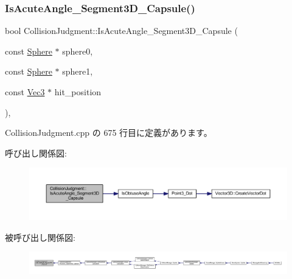 \subsubsection{\texorpdfstring{Is\+Acute\+Angle\+\_\+\+Segment3\+D\+\_\+\+Capsule()}{IsAcuteAngle\_Segment3D\_Capsule()}}
{\footnotesize\ttfamily bool Collision\+Judgment\+::\+Is\+Acute\+Angle\+\_\+\+Segment3\+D\+\_\+\+Capsule (\begin{DoxyParamCaption}\item[{const \mbox{\hyperlink{class_sphere}{Sphere}} $\ast$}]{sphere0,  }\item[{const \mbox{\hyperlink{class_sphere}{Sphere}} $\ast$}]{sphere1,  }\item[{const \mbox{\hyperlink{_vector3_d_8h_ab16f59e4393f29a01ec8b9bbbabbe65d}{Vec3}} $\ast$}]{hit\+\_\+position }\end{DoxyParamCaption})\hspace{0.3cm}{\ttfamily [static]}, {\ttfamily [private]}}



 Collision\+Judgment.\+cpp の 675 行目に定義があります。

呼び出し関係図\+:\nopagebreak
\begin{figure}[H]
\begin{center}
\leavevmode
\includegraphics[width=350pt]{class_collision_judgment_af4da6d6923d8ee57253b1e86436e6ec5_cgraph}
\end{center}
\end{figure}
被呼び出し関係図\+:
\nopagebreak
\begin{figure}[H]
\begin{center}
\leavevmode
\includegraphics[width=350pt]{class_collision_judgment_af4da6d6923d8ee57253b1e86436e6ec5_icgraph}
\end{center}
\end{figure}
\mbox{\label{class_collision_judgment_a4aa40ec5573967470aeac8f7cb59b67d}} 
